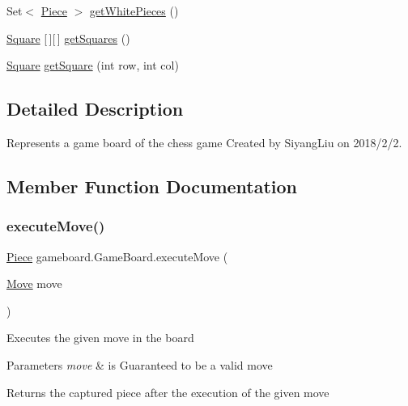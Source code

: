 \begin{DoxyCompactItemize}
\item 
Set$<$ \mbox{\hyperlink{classpieces_1_1_piece}{Piece}} $>$ \mbox{\hyperlink{classgameboard_1_1_game_board_a5c9d9bdb8c155fbc01c72760b33dba1e}{get\+White\+Pieces}} ()
\item 
\mbox{\hyperlink{classgameboard_1_1_square}{Square}} \mbox{[}$\,$\mbox{]}\mbox{[}$\,$\mbox{]} \mbox{\hyperlink{classgameboard_1_1_game_board_a862261920d74b60acd609bfc7d1b1bc2}{get\+Squares}} ()
\item 
\mbox{\hyperlink{classgameboard_1_1_square}{Square}} \mbox{\hyperlink{classgameboard_1_1_game_board_a9a1fa2f3221dc4705f492166ce9dd071}{get\+Square}} (int row, int col)
\end{DoxyCompactItemize}


\subsection{Detailed Description}
Represents a game board of the chess game Created by Siyang\+Liu on 2018/2/2. 

\subsection{Member Function Documentation}
\mbox{\label{classgameboard_1_1_game_board_a368adac08213b4311a2897a273acc118}} 
\subsubsection{\texorpdfstring{execute\+Move()}{executeMove()}}
{\footnotesize\ttfamily \mbox{\hyperlink{classpieces_1_1_piece}{Piece}} gameboard.\+Game\+Board.\+execute\+Move (\begin{DoxyParamCaption}\item[{\mbox{\hyperlink{classpieces_1_1_move}{Move}}}]{move }\end{DoxyParamCaption})}

Executes the given move in the board 
\begin{DoxyParams}{Parameters}
{\em move} & is Guaranteed to be a valid move \\
\hline
\end{DoxyParams}
\begin{DoxyReturn}{Returns}
the captured piece after the execution of the given move 
\end{DoxyReturn}
\mbox{\label{classgameboard_1_1_game_board_a6dbc8479a689353cfde617056007b5f1}} 
